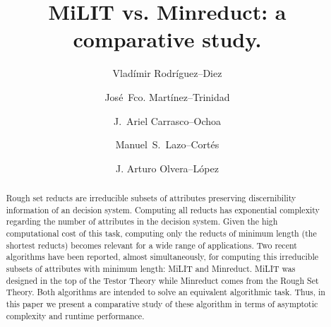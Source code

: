\documentclass[citenumber]{llncs}
\begin{document}
\mainmatter              %
%
\title{MiLIT vs. Minreduct: a comparative study.}
			 
\author{Vlad\'{i}mir Rodr\'{i}guez--Diez \and Jos\'{e}~Fco. Mart\'{i}nez--Trinidad
		 \and J.~Ariel Carrasco--Ochoa \and Manuel~S.~Lazo--Cortés \and J. Arturo Olvera--López}
%
%


\maketitle              %

\begin{abstract}
	Rough set reducts are irreducible subsets of attributes preserving discernibility information of an decision system. Computing all reducts has exponential complexity regarding the number of attributes in the decision system. Given the high computational cost of this task, computing only the reducts of minimum length (the shortest reducts) becomes relevant for a wide range of applications. Two recent algorithms have been reported, almost simultaneously, for computing this irreducible subsets of attributes with minimum length: MiLIT and Minreduct. MiLIT was designed in the top of the Testor Theory while Minreduct comes from the Rough Set Theory. Both algorithms are intended to solve an equivalent algorithmic task. Thus, in this paper we present a comparative study of these algorithm in terms of asymptotic complexity and runtime performance. 
	
\end{abstract}
%
\end{document}
